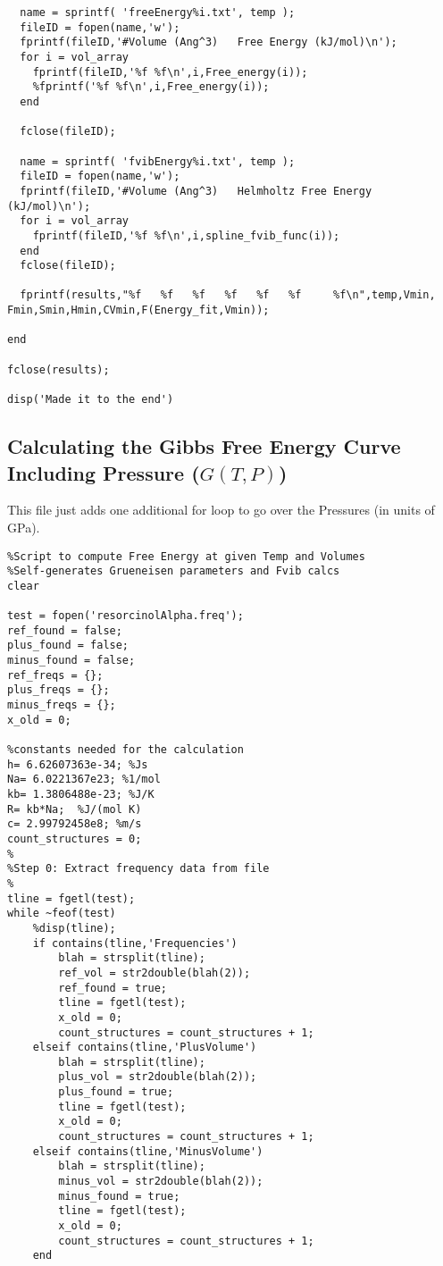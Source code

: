 \documentclass[11pt,letterpaper]{article}
\begin{document}
\begin{spacing}{1.0}
\begin{verbatim}
  name = sprintf( 'freeEnergy%i.txt', temp );
  fileID = fopen(name,'w');
  fprintf(fileID,'#Volume (Ang^3)   Free Energy (kJ/mol)\n');
  for i = vol_array
    fprintf(fileID,'%f %f\n',i,Free_energy(i));
    %fprintf('%f %f\n',i,Free_energy(i));
  end

  fclose(fileID);
  
  name = sprintf( 'fvibEnergy%i.txt', temp );
  fileID = fopen(name,'w');
  fprintf(fileID,'#Volume (Ang^3)   Helmholtz Free Energy (kJ/mol)\n');
  for i = vol_array
    fprintf(fileID,'%f %f\n',i,spline_fvib_func(i));
  end
  fclose(fileID);

  fprintf(results,"%f   %f   %f   %f   %f   %f     %f\n",temp,Vmin,
Fmin,Smin,Hmin,CVmin,F(Energy_fit,Vmin));

end

fclose(results);

disp('Made it to the end')
\end{verbatim}

\subsection{Calculating the Gibbs Free Energy Curve Including Pressure ($G(T,P)$)}

This file just adds one additional for loop to go over the Pressures (in units of GPa).

\begin{verbatim}
%Script to compute Free Energy at given Temp and Volumes
%Self-generates Grueneisen parameters and Fvib calcs
clear

test = fopen('resorcinolAlpha.freq');
ref_found = false;
plus_found = false;
minus_found = false;
ref_freqs = {};
plus_freqs = {};
minus_freqs = {};
x_old = 0;

%constants needed for the calculation
h= 6.62607363e-34; %Js
Na= 6.0221367e23; %1/mol
kb= 1.3806488e-23; %J/K
R= kb*Na;  %J/(mol K)
c= 2.99792458e8; %m/s
count_structures = 0;
%
%Step 0: Extract frequency data from file
%
tline = fgetl(test);
while ~feof(test)
    %disp(tline);
    if contains(tline,'Frequencies')
        blah = strsplit(tline);
        ref_vol = str2double(blah(2));
        ref_found = true;
        tline = fgetl(test);
        x_old = 0;
        count_structures = count_structures + 1;
    elseif contains(tline,'PlusVolume')
        blah = strsplit(tline);
        plus_vol = str2double(blah(2));
        plus_found = true;
        tline = fgetl(test);
        x_old = 0;
        count_structures = count_structures + 1;
    elseif contains(tline,'MinusVolume')
        blah = strsplit(tline);
        minus_vol = str2double(blah(2));
        minus_found = true;
        tline = fgetl(test);
        x_old = 0;
        count_structures = count_structures + 1;
    end
    

\end{verbatim}
\end{spacing}
\end{document}
